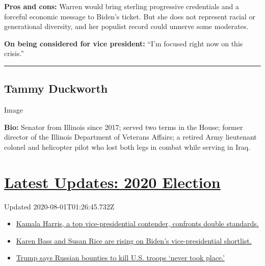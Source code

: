\textbf{Pros and cons:} Warren would bring sterling progressive
credentials and a forceful economic message to Biden's ticket. But she
does not represent racial or generational diversity, and her populist
record could unnerve some moderates.

\textbf{On being considered for vice president:} ``I'm focused right now
on this crisis.''

\begin{center}\rule{0.5\linewidth}{\linethickness}\end{center}

\hypertarget{tammy-duckworth}{%
\subsection{Tammy Duckworth}\label{tammy-duckworth}}

Image

\textbf{Bio:} Senator from Illinois since 2017; served two terms in the
House; former director of the Illinois Department of Veterans Affairs; a
retired Army lieutenant colonel and helicopter pilot who lost both legs
in combat while serving in Iraq.

\hypertarget{latest-updates-2020-election}{%
\section{\texorpdfstring{\href{https://www.nytimes.com/2020/07/31/us/elections/biden-vs-trump.html?action=click\&pgtype=Article\&state=default\&region=MAIN_CONTENT_1\&context=storylines_live_updates}{Latest
Updates: 2020
Election}}{Latest Updates: 2020 Election}}\label{latest-updates-2020-election}}

Updated 2020-08-01T01:26:45.732Z

\begin{itemize}
\tightlist
\item
  \href{https://www.nytimes.com/2020/07/31/us/elections/biden-vs-trump.html?action=click\&pgtype=Article\&state=default\&region=MAIN_CONTENT_1\&context=storylines_live_updates\#link-29fdff45}{Kamala
  Harris, a top vice-presidential contender, confronts double
  standards.}
\item
  \href{https://www.nytimes.com/2020/07/31/us/elections/biden-vs-trump.html?action=click\&pgtype=Article\&state=default\&region=MAIN_CONTENT_1\&context=storylines_live_updates\#link-13ec3d9c}{Karen
  Bass and Susan Rice are rising on Biden's vice-presidential
  shortlist.}
\item
  \href{https://www.nytimes.com/2020/07/31/us/elections/biden-vs-trump.html?action=click\&pgtype=Article\&state=default\&region=MAIN_CONTENT_1\&context=storylines_live_updates\#link-49e9a016}{Trump
  says Russian bounties to kill U.S. troops `never took place.'}
\end{itemize}

